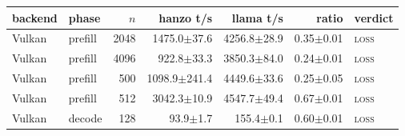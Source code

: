 \begin{tabular}{@{}llrrrrl@{}}
\toprule
backend & phase & $n$ & hanzo t/s & llama t/s & ratio & verdict \\
\midrule
Vulkan & prefill & 2048 & 1475.0$\pm$37.6 & 4256.8$\pm$28.9 & 0.35$\pm$0.01 & \textsc{loss} \\
Vulkan & prefill & 4096 & 922.8$\pm$33.3 & 3850.3$\pm$84.0 & 0.24$\pm$0.01 & \textsc{loss} \\
Vulkan & prefill & 500 & 1098.9$\pm$241.4 & 4449.6$\pm$33.6 & 0.25$\pm$0.05 & \textsc{loss} \\
Vulkan & prefill & 512 & 3042.3$\pm$10.9 & 4547.7$\pm$49.4 & 0.67$\pm$0.01 & \textsc{loss} \\
Vulkan & decode & 128 & 93.9$\pm$1.7 & 155.4$\pm$0.1 & 0.60$\pm$0.01 & \textsc{loss} \\
\bottomrule
\end{tabular}
